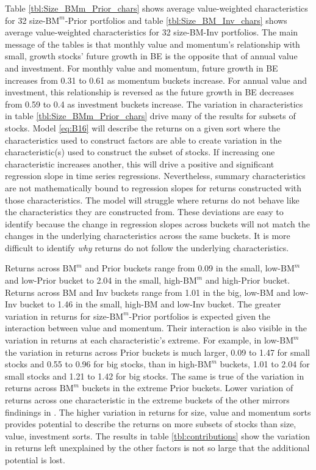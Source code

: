 
Table \ref{tbl:Size_BMm_Prior_chars} shows average value-weighted
characteristics for 32 size-$\text{BM}^m$-Prior portfolios and table
\ref{tbl:Size_BM_Inv_chars} shows average value-weighted characteristics for 32
size-BM-Inv portfolios. The main message of the tables is that monthly value
and momentum's relationship with small, growth stocks' future growth in BE is
the opposite that of annual value and investment. For monthly value and
momentum, future growth in BE increases from 0.31 to 0.61 as momentum buckets
increase. For annual value and investment, this relationship is reversed as the
future growth in BE decreases from 0.59 to 0.4 as investment buckets increase.
The variation in characteristics in table \ref{tbl:Size_BMm_Prior_chars} drive
many of the results for subsets of stocks. Model \ref{eq:B16} will describe the
returns on a given sort where the characteristics used to construct factors are
able to create variation in the characteristic(s) used to construct the subset
of stocks. If increasing one characteristic increases another, this will drive
a positive and significant regression slope in time series regressions.
Nevertheless, summary characteristics are not mathematically bound to
regression slopes for returns constructed with those characteristics. The model
will struggle where returns do not behave like the characteristics they are
constructed from. These deviations are easy to identify because the change in
regression slopes across buckets will not match the changes in the underlying
characteristics across the same buckets. It is more difficult to identify
\emph{why} returns do not follow the underlying characteristics.

Returns across $\text{BM}^m$ and Prior buckets range from 0.09 in the small,
low-$\text{BM}^m$ and low-Prior bucket to 2.04 in the small, high-$\text{BM}^m$
and high-Prior bucket. Returns across BM and Inv buckets range from 1.01 in the
big, low-BM and low-Inv bucket to 1.46 in the small, high-BM and low-Inv
bucket. The greater variation in returns for size-$\text{BM}^m$-Prior
portfolios is expected given the interaction between value and momentum. Their
interaction is also visible in the variation in returns at each
characteristic's extreme. For example, in low-$\text{BM}^m$ the variation in
returns across Prior buckets is much larger, 0.09 to 1.47 for small stocks and
0.55 to 0.96 for big stocks, than in high-$\text{BM}^m$ buckets, 1.01 to 2.04
for small stocks and 1.21 to 1.42 for big stocks. The same is true of the
variation in returns across $\text{BM}^m$ buckets in the extreme Prior buckets.
Lower variation of returns across one characteristic in the extreme buckets of
the other mirrors findinings in \textcite{asness2013devil}. The higher
variation in returns for size, value and momentum sorts provides potential to
describe the returns on more subsets of stocks than size, value, investment
sorts. The results in table \ref{tbl:contributions} show the variation in
returns left unexplained by the other factors is not so large that the
additional potential is lost.

